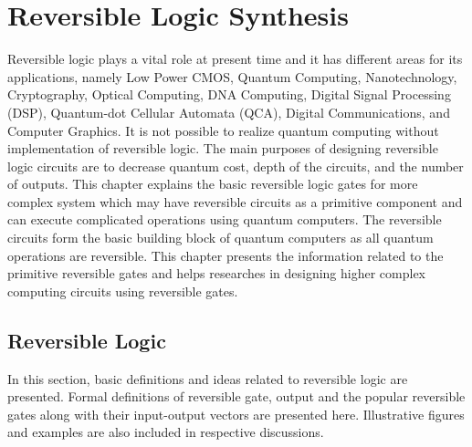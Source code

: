 

\chapter{Reversible Logic Synthesis}
\label{ch:part1_chapter1}


Reversible logic plays a vital role at present time and it has different areas for its applications, namely Low Power CMOS, Quantum Computing, Nanotechnology, Cryptography,
Optical Computing, DNA Computing, Digital Signal Processing (DSP), Quantum-dot Cellular Automata (QCA), Digital Communications, and Computer Graphics. It is not possible to realize quantum computing without implementation of reversible logic. The main purposes of designing reversible logic circuits are to decrease quantum cost, depth of the circuits, and the number of  outputs.%
This chapter explains the basic reversible logic gates for more complex system which may have reversible circuits as a primitive component and can execute complicated operations using quantum computers. The reversible circuits form the basic building block of quantum computers as all quantum operations are reversible. This chapter presents the information related to the primitive reversible gates and helps researches in designing higher complex computing circuits using reversible gates.


\section{Reversible Logic}
In this section, basic definitions and ideas related to reversible logic are presented. Formal definitions of reversible gate,  output and the popular reversible gates along with their input-output vectors are presented here.
Illustrative figures and examples are also included in respective discussions.

